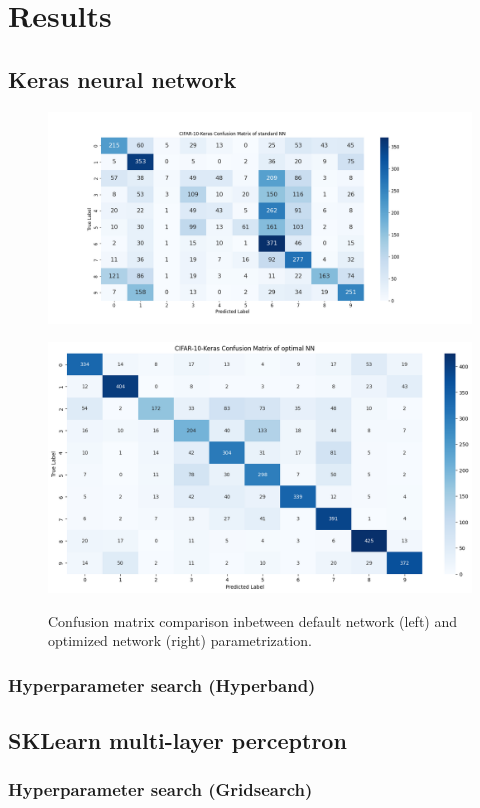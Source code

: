 \chapter{Results}
\section{Keras neural network}

\begin{figure}[H]
    \centering
    \begin{minipage}{.5\textwidth}
      \centering
      \includegraphics[width=1.0\linewidth]{img/ConfusionMatrix_standard.png}
      \label{fig:confusion_matrix_standard}
    \end{minipage}%
    \begin{minipage}{.5\textwidth}
      \centering
      \includegraphics[width=1.0\linewidth]{img/ConfusionMatrix_optimal.png}
      \label{fig:confusion_matrix_optimal}
    \end{minipage}
    \caption{Confusion matrix comparison inbetween default network (left) and optimized network (right) parametrization.}
    \label{fig:confusion_matrix_overview}
\end{figure}



\subsection{Hyperparameter search (Hyperband)}

\section{SKLearn multi-layer perceptron}
\subsection{Hyperparameter search (Gridsearch)}
